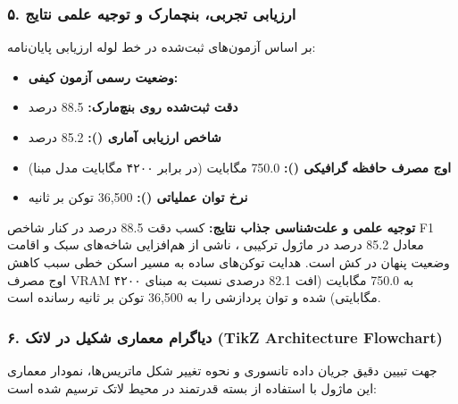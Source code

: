 \subsubsection*{۵. ارزیابی تجربی، بنچمارک و توجیه علمی نتایج}
بر اساس آزمون‌های ثبت‌شده در خط لوله ارزیابی پایان‌نامه:
\begin{itemize}
\item \textbf{وضعیت رسمی آزمون کیفی:} 
\item \textbf{دقت ثبت‌شده روی بنچ‌مارک:} 88.5 درصد
\item \textbf{شاخص ارزیابی آماری ():} 85.2 درصد
\item \textbf{اوج مصرف حافظه گرافیکی ():} 750.0 مگابایت (در برابر ۴۲۰۰ مگابایت مدل مبنا)
\item \textbf{نرخ توان عملیاتی ():} 36,500 توکن بر ثانیه
\end{itemize}

\textbf{توجیه علمی و علت‌شناسی جذاب نتایج:}
کسب دقت 88.5 درصد در کنار شاخص F1 معادل 85.2 درصد در ماژول ترکیبی ، ناشی از هم‌افزایی شاخه‌های سبک و اقامت وضعیت پنهان در کش  است. هدایت توکن‌های ساده به مسیر اسکن خطی سبب کاهش اوج مصرف VRAM به 750.0 مگابایت (افت 82.1 درصدی نسبت به مبنای ۴۲۰۰ مگابایتی) شده و توان پردازشی را به 36,500 توکن بر ثانیه رسانده است.



\subsubsection*{۶. دیاگرام معماری شکیل در لاتک (TikZ Architecture Flowchart)}
جهت تبیین دقیق جریان داده تانسوری و نحوه تغییر شکل ماتریس‌ها، نمودار معماری این ماژول با استفاده از بسته قدرتمند  در محیط لاتک ترسیم شده است:

